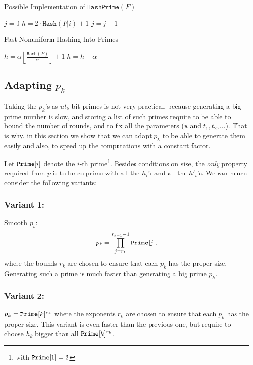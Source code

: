 \documentclass[11pt]{llncs}
\newcommand{\Hash}{\ensuremath{\mathtt{Hash}}}
\newcommand{\HashPrime}{\ensuremath{\mathtt{HashPrime}}}
\begin{document}
\begin{algorithm}[t]
  \caption{Possible Implementation of $\HashPrime(F)$}
  \label{alg:primes}
  \begin{algorithmic}[1]
  \State $j=0$
\Repeat
\State $h = 2\cdot\Hash(F|i)+1$
\State $j = j+1$
\State {}
  \end{algorithmic}
\end{algorithm}

\begin{algorithm}[t]
  \caption{Fast Nonuniform Hashing Into Primes}
  \label{alg:scanprime}
  \begin{algorithmic}[1]
  \State $h =\alpha \left\lfloor\frac{\Hash(F)}{\alpha}\right\rfloor+1$
\State $h = h-\alpha$
\EndWhile
\State {}
  \end{algorithmic}
\end{algorithm}

\subsection{Adapting $p_k$}
\label{sec:choicep}

Taking the $p_k$'s as $ut_k$-bit primes is not very practical, because generating a big prime number is slow, and storing a list of such primes require to be able to bound the number of rounds, and to fix all the parameters ($u$ and $t_1,t_2,\dots$).
That is why, in this section we show that we can adapt $p_k$ to be able to generate them easily and also, to speed up the computations with a constant factor.

Let $\mbox{{\tt Prime}}[i]$ denote the $i$-th prime\footnote{with $\mbox{{\tt Prime}}[1]=2$}. Besides conditions on size, the \textit{only} property required from $p$ is to be co-prime with all the $h_i$'s and all the $h'_i$'s. We can hence consider the following variants:
\subsubsection{Variant 1:} Smooth $p_k$:
\[ p_k=\prod_{j=r_k}^{r_{k+1}-1} \mbox{{\tt Prime}}[j], \]
where the bounds $r_k$ are chosen to ensure that each $p_k$ has the proper size.
Generating such a prime is much faster than generating a big prime $p_k$.

\subsubsection{Variant 2:} $p_k=\mbox{{\tt Prime}}[k]^{r_k}$ where the exponents $r_k$ are chosen to ensure that each $p_k$ has the proper size.
This variant is even faster than the previous one, but require to choose $h_k$ bigger than all
$\mbox{{\tt Prime}}[k]^{r_k}$. 
\end{document}
